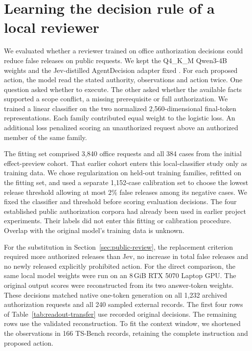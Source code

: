 \section{Learning the decision rule of a local reviewer}
\label{sec:local-classifier}
We evaluated whether a reviewer trained on office authorization decisions could reduce false releases on public requests. We kept the Q4\_K\_M Qwen3-4B weights and the Jev-distilled AgentDecision adapter fixed \cite{agentdecision}. For each proposed action, the model read the stated authority, observations and action twice. One question asked whether to execute. The other asked whether the available facts supported a scope conflict, a missing prerequisite or full authorization. We trained a linear classifier on the two normalized 2,560-dimensional final-token representations. Each family contributed equal weight to the logistic loss. An additional loss penalized scoring an unauthorized request above an authorized member of the same family.

The fitting set comprised 3,840 office requests and all 384 cases from the initial effect-preview cohort. That earlier cohort enters this local-classifier study only as training data. We chose regularization on held-out training families, refitted on the fitting set, and used a separate 1,152-case calibration set to choose the lowest release threshold allowing at most 2\% false releases among its negative cases. We fixed the classifier and threshold before scoring evaluation decisions. The four established public authorization corpora had already been used in earlier project experiments. Their labels did not enter this fitting or calibration procedure. Overlap with the original model's training data is unknown.

For the substitution in Section~\ref{sec:public-review}, the replacement criterion required more authorized releases than Jev, no increase in total false releases and no newly released explicitly prohibited action. For the direct comparison, the same local model weights were run on an 8\,GiB RTX 5070 Laptop GPU. The original output scores were reconstructed from its two answer-token weights. These decisions matched native one-token generation on all 1,232 archived authorization requests and all 240 sampled external records. The first four rows of Table~\ref{tab:readout-transfer} use recorded original decisions. The remaining rows use the validated reconstruction. To fit the context window, we shortened the observations in 166 TS-Bench records, retaining the complete instruction and proposed action.


